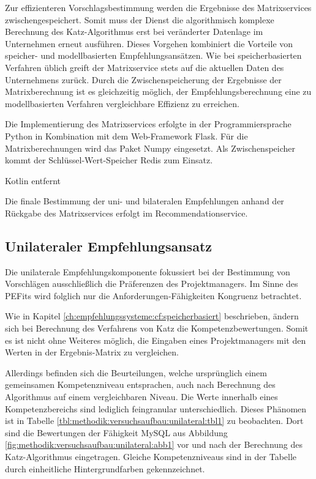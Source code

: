 

Zur effizienteren Vorschlagsbestimmung werden die Ergebnisse des Matrixservices zwischengespeichert. Somit muss der Dienst die algorithmisch komplexe Berechnung des Katz-Algorithmus erst bei veränderter Datenlage im Unternehmen erneut ausführen. Dieses Vorgehen kombiniert die Vorteile von speicher- und modellbasierten Empfehlungsansätzen. Wie bei speicherbasierten Verfahren üblich greift der Matrixservice stets auf die aktuellen Daten des Unternehmens zurück. Durch die Zwischenspeicherung der Ergebnisse der Matrixberechnung ist es gleichzeitig möglich, der Empfehlungsberechnung eine zu modellbasierten Verfahren vergleichbare Effizienz zu erreichen.

Die Implementierung des Matrixservices erfolgte in der Programmiersprache Python in Kombination mit dem Web-Framework Flask. Für die Matrixberechnungen wird das Paket Numpy eingesetzt. Als Zwischenspeicher kommt der Schlüssel-Wert-Speicher Redis zum Einsatz.

Kotlin entfernt

Die finale Bestimmung der uni- und bilateralen Empfehlungen anhand der Rückgabe des Matrixservices erfolgt im Recommendationservice.

\newpage
\subsection{Unilateraler Empfehlungsansatz}
\label{ch:methodik:versuchsaufbau:unilateral}
Die unilaterale Empfehlungskomponente fokussiert bei der Bestimmung von Vorschlägen ausschließlich die Präferenzen des Projektmanagers. Im Sinne des \acp{PEFit} wird folglich nur die Anforderungen-Fähigkeiten Kongruenz betrachtet.

Wie in Kapitel \ref{ch:empfehlungssysteme:cf:speicherbasiert} beschrieben, ändern sich bei Berechnung des Verfahrens von Katz die Kompetenzbewertungen. Somit es ist nicht ohne Weiteres möglich, die Eingaben eines Projektmanagers mit den Werten in der Ergebnis-Matrix zu vergleichen.

Allerdings befinden sich die Beurteilungen, welche ursprünglich einem gemeinsamen Kompetenzniveau entsprachen, auch nach Berechnung des Algorithmus auf einem vergleichbaren Niveau. Die Werte innerhalb eines Kompetenzbereichs sind lediglich feingranular unterschiedlich. Dieses Phänomen ist in Tabelle \ref{tbl:methodik:versuchsaufbau:unilateral:tbl1} zu beobachten. Dort sind die Bewertungen der Fähigkeit MySQL aus Abbildung \ref{fig:methodik:versuchsaufbau:unilateral:abb1} vor und nach der Berechnung des Katz-Algorithmus eingetragen. Gleiche Kompetenzniveaus sind in der Tabelle durch einheitliche Hintergrundfarben gekennzeichnet.

